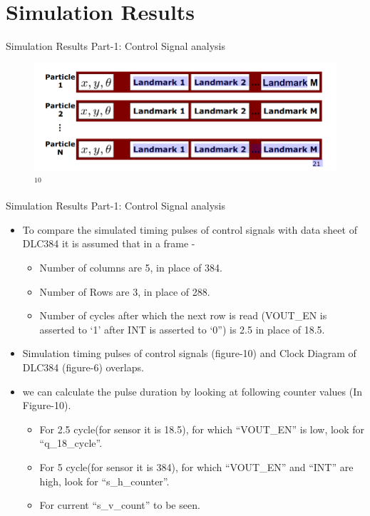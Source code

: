 \documentclass{beamer}
\begin{document}
\section{Simulation Results}
\begin{frame}{Simulation Results Part-1: Control Signal analysis}
    \begin{figure}
        \centering
        \includegraphics[width=\textwidth]{RBPF_SLAM.png}$^{10}$
    \end{figure}
\end{frame}


\begin{frame}{Simulation Results Part-1: Control Signal analysis}
    \begin{itemize}
        \item To compare the simulated timing pulses of control signals with data sheet of DLC384 it is assumed that in a frame -
            \begin{itemize}
                \item Number of columns are 5, in place of 384.
                \item Number of Rows are 3, in place of 288.
                \item Number of cycles after which the next row is read (VOUT\_EN is asserted to ‘1’ after INT is asserted to ‘0”) is 2.5 in place of 18.5.
            \end{itemize}
        \item Simulation timing pulses of control signals (figure-10) and Clock Diagram of DLC384 (figure-6) overlaps.
        \item we can calculate the pulse duration by looking at following counter values (In Figure-10).
            \begin{itemize}
                \item For 2.5 cycle(for sensor it is 18.5), for which “VOUT\_EN” is low, look for “q\_18\_cycle”.
                \item For 5 cycle(for sensor it is 384), for which “VOUT\_EN” and “INT” are high, look for “s\_h\_counter”.
                \item For current “s\_v\_count” to be seen.
            \end{itemize}
    \end{itemize}
\end{frame}
\end{document}
